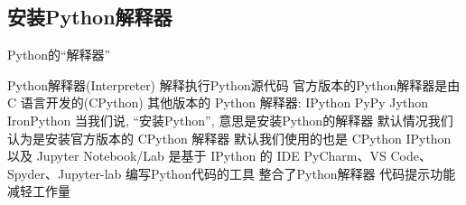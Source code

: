 \subsection{安装Python解释器}

\begin{frame}{Python的``解释器''}
    \begin{myoutline}
        \1 Python解释器(Interpreter)
            \2 解释执行Python源代码
            \2 官方版本的Python解释器是由 C 语言开发的(CPython)
            \2 其他版本的 Python 解释器:
                \3 IPython
                \3 PyPy
                \3 Jython 
                \3 IronPython 
        \1 当我们说, “安装Python”, 意思是安装Python的解释器
            \2 默认情况我们认为是安装官方版本的 CPython 解释器
            \2 默认我们使用的也是 CPython 
            \2 IPython 以及 Jupyter Notebook/Lab 是基于 IPython 的
        \1 IDE
            \2 PyCharm、VS Code、Spyder、Jupyter-lab
                \3 编写Python代码的工具
                \3 整合了Python解释器
                \3 代码提示功能
                \3 减轻工作量
    \end{myoutline}
\end{frame}

